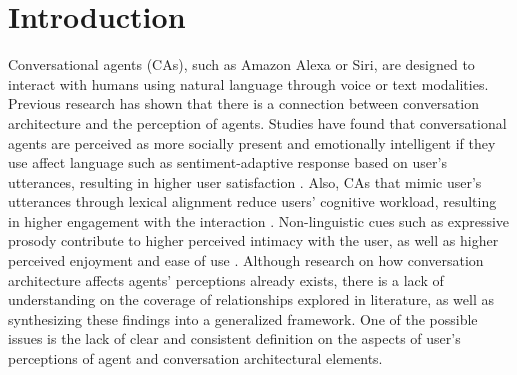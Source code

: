 \documentclass[sigconf,screen,review, anonymous]{acmart}
\begin{document}
\section{Introduction}

Conversational agents (CAs), such as Amazon Alexa or Siri, are designed to interact with humans using natural language through voice or text modalities. %
Previous research has shown that there is a connection between conversation architecture and the perception of agents. Studies have found that conversational agents are perceived as more socially present and emotionally intelligent if they use affect language such as sentiment-adaptive response based on user's utterances, resulting in higher user satisfaction \cite{diederich2019emulating}\cite{yang2017perceived}. Also, CAs that mimic user's utterances through lexical alignment reduce users' cognitive workload, resulting in higher engagement with the interaction \cite{spillner2021talk}. Non-linguistic cues such as expressive prosody contribute to higher perceived intimacy with the user, as well as higher perceived enjoyment and ease of use \cite{kim2020can}. Although research on how conversation architecture affects agents' perceptions already exists, there is a lack of understanding on the coverage of relationships explored in literature, as well as synthesizing these findings into a generalized framework. One of the possible issues is the lack of clear and consistent definition on the aspects of user's perceptions of agent and conversation architectural elements.
\end{document}
